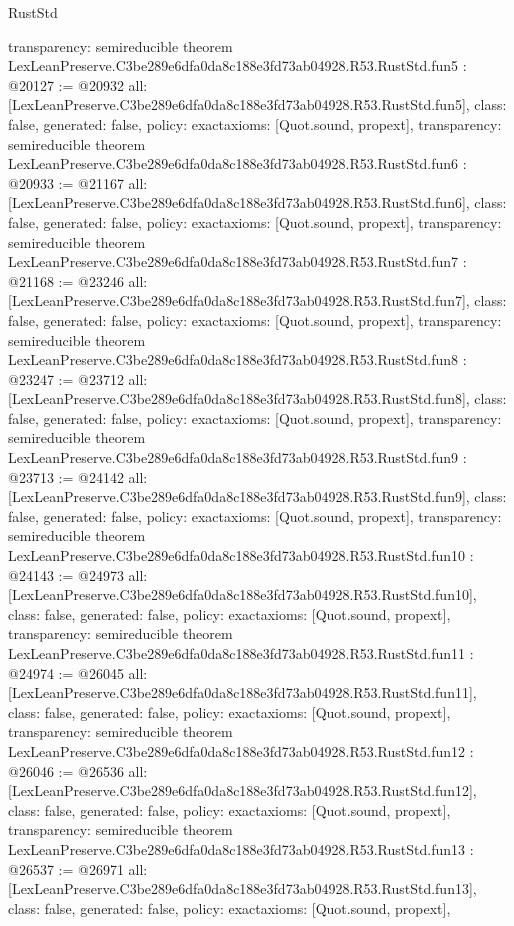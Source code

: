 \begin{lexlean}{RustStd}
\begin{coremodule}
{  transparency: semireducible
}
theorem LexLeanPreserve.C3be289e6dfa0da8c188e3fd73ab04928.R53.RustStd.fun5 : @20127 := @20932 {
  all: [LexLeanPreserve.C3be289e6dfa0da8c188e3fd73ab04928.R53.RustStd.fun5],
  class: false,
  generated: false,
  policy: exact{axioms: [Quot.sound, propext]},
  transparency: semireducible
}
theorem LexLeanPreserve.C3be289e6dfa0da8c188e3fd73ab04928.R53.RustStd.fun6 : @20933 := @21167 {
  all: [LexLeanPreserve.C3be289e6dfa0da8c188e3fd73ab04928.R53.RustStd.fun6],
  class: false,
  generated: false,
  policy: exact{axioms: [Quot.sound, propext]},
  transparency: semireducible
}
theorem LexLeanPreserve.C3be289e6dfa0da8c188e3fd73ab04928.R53.RustStd.fun7 : @21168 := @23246 {
  all: [LexLeanPreserve.C3be289e6dfa0da8c188e3fd73ab04928.R53.RustStd.fun7],
  class: false,
  generated: false,
  policy: exact{axioms: [Quot.sound, propext]},
  transparency: semireducible
}
theorem LexLeanPreserve.C3be289e6dfa0da8c188e3fd73ab04928.R53.RustStd.fun8 : @23247 := @23712 {
  all: [LexLeanPreserve.C3be289e6dfa0da8c188e3fd73ab04928.R53.RustStd.fun8],
  class: false,
  generated: false,
  policy: exact{axioms: [Quot.sound, propext]},
  transparency: semireducible
}
theorem LexLeanPreserve.C3be289e6dfa0da8c188e3fd73ab04928.R53.RustStd.fun9 : @23713 := @24142 {
  all: [LexLeanPreserve.C3be289e6dfa0da8c188e3fd73ab04928.R53.RustStd.fun9],
  class: false,
  generated: false,
  policy: exact{axioms: [Quot.sound, propext]},
  transparency: semireducible
}
theorem LexLeanPreserve.C3be289e6dfa0da8c188e3fd73ab04928.R53.RustStd.fun10 : @24143 := @24973 {
  all: [LexLeanPreserve.C3be289e6dfa0da8c188e3fd73ab04928.R53.RustStd.fun10],
  class: false,
  generated: false,
  policy: exact{axioms: [Quot.sound, propext]},
  transparency: semireducible
}
theorem LexLeanPreserve.C3be289e6dfa0da8c188e3fd73ab04928.R53.RustStd.fun11 : @24974 := @26045 {
  all: [LexLeanPreserve.C3be289e6dfa0da8c188e3fd73ab04928.R53.RustStd.fun11],
  class: false,
  generated: false,
  policy: exact{axioms: [Quot.sound, propext]},
  transparency: semireducible
}
theorem LexLeanPreserve.C3be289e6dfa0da8c188e3fd73ab04928.R53.RustStd.fun12 : @26046 := @26536 {
  all: [LexLeanPreserve.C3be289e6dfa0da8c188e3fd73ab04928.R53.RustStd.fun12],
  class: false,
  generated: false,
  policy: exact{axioms: [Quot.sound, propext]},
  transparency: semireducible
}
theorem LexLeanPreserve.C3be289e6dfa0da8c188e3fd73ab04928.R53.RustStd.fun13 : @26537 := @26971 {
  all: [LexLeanPreserve.C3be289e6dfa0da8c188e3fd73ab04928.R53.RustStd.fun13],
  class: false,
  generated: false,
  policy: exact{axioms: [Quot.sound, propext]},
}
\end{coremodule}
\end{lexlean}

